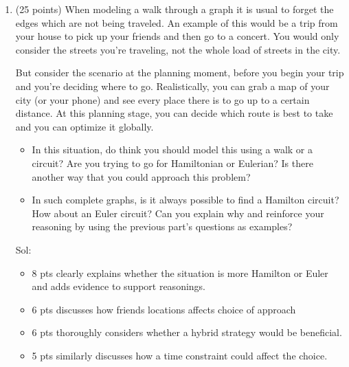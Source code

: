 \documentclass[12pt]{exam}
\begin{document}
\begin{enumerate}
\iffalse
Sol:
\begin{enumerate}
    \item A walk starts and ends at different places whereas a circuit begins and ends at the same place.
    \item Eulerian means that edges are the object of interest to traverse, while Hamiltonian means that the vertices are the traversed ones.
    \item Any path graph.
    \item A path graph with any pair of middle vertices connected.
    \item Two triangles joined at a vertex, say a ribbon.
    \item The ribbon graph again.
    \item A cycle with more than four vertices with any two non-adjacent vertices connected.
\end{enumerate}
\fi
\newpage
\item (25 points) When modeling a walk through a graph it is usual to forget the edges which are not being traveled. An example of this would be a trip from your house to pick up your friends and then go to a concert. You would only consider the streets you're traveling, not the whole load of streets in the city.\par
But consider the scenario at the planning moment, before you begin your trip and you're deciding where to go. Realistically, you can grab a map of your city (or your phone) and see every place there is to go up to a certain distance. At this planning stage, you can decide which route is best to take and you can optimize it globally. 
\begin{itemize}
    \item In this situation, do think you should model this using a walk or a circuit? Are you trying to go for Hamiltonian or Eulerian? Is there another way that you could approach this problem?
    \item In such complete graphs, is it always possible to find a Hamilton circuit? How about an Euler circuit? Can you explain why and reinforce your reasoning by using the previous part's questions as examples?
\end{itemize}

Sol:
\begin{itemize}
    \item 8 pts clearly explains whether the situation is more Hamilton or Euler and adds evidence to support reasonings.
    \item 6 pts discusses how friends locations affects choice of approach
    \item 6 pts thoroughly considers whether a hybrid strategy would be beneficial.
    \item 5 pts similarly discusses how a time constraint could affect the choice.
\end{itemize}

\end{enumerate}
\end{document}
